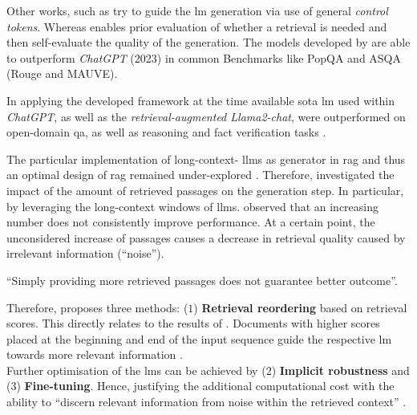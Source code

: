 Other works, such as \citet{lu2022QuarkCT, Korbak2023PretrainingLM} try to guide the \ac{lm} generation via use of general \textit{control tokens}.
Whereas \citet{Asai2023SelfRAGLT} enables prior evaluation of whether a retrieval is needed and then self-evaluate the quality of the generation.
The models developed by \citet{Asai2023SelfRAGLT} are able to outperform \textit{ChatGPT} (2023) in common Benchmarks like PopQA and ASQA (Rouge and MAUVE).

In applying the developed framework at the time available \ac{sota} \ac{lm} used within \textit{ChatGPT}, as well as the \textit{retrieval-augmented Llama2-chat}, were outperformed on open-domain \ac{qa}, as well as reasoning and fact verification tasks \citep{jin2024longcontextllmsmeetrag}.
%

%
The particular implementation of long-context- \acp{llm} as generator in \ac{rag} and thus an optimal design of \ac{rag} remained under-explored \citep{jin2024longcontextllmsmeetrag}.
%
Therefore, \citet{jin2024longcontextllmsmeetrag} investigated the impact of the amount of retrieved passages on the generation step.
In particular, by leveraging the long-context windows of \acp{llm}.
\citet{jin2024longcontextllmsmeetrag} observed that an increasing number does not consistently improve performance.
At a certain point, the unconsidered increase of passages causes a decrease in retrieval quality caused by irrelevant information (\enquote{noise}).

\enquote{Simply providing more retrieved passages does not guarantee better outcome}\citep[p.2]{jin2024longcontextllmsmeetrag}.

Therefore, \citet{jin2024longcontextllmsmeetrag} proposes three methods: ($1$) \textbf{Retrieval reordering} based on retrieval scores.
This directly relates to the results of \citet{liu2024lostmiddle}.
Documents with higher scores placed at the beginning and end of the input sequence guide the respective \ac{lm} towards more relevant information \citep{jin2024longcontextllmsmeetrag}.\\
Further optimisation of the \acp{lm} can be achieved by ($2$) \textbf{Implicit robustness} and ($3$) \textbf{Fine-tuning}.
Hence, justifying the additional computational cost with the ability to \enquote{discern relevant information from noise within the retrieved context} \citep[p.2]{jin2024longcontextllmsmeetrag}.
%

